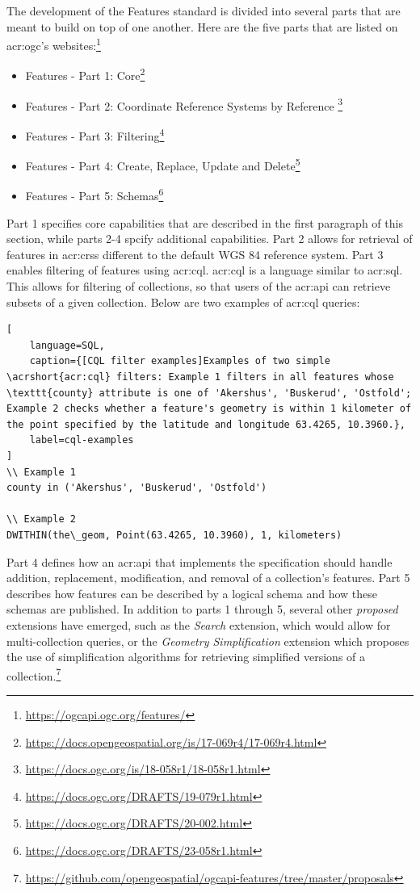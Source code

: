 The development of the Features standard is divided into several parts that are meant to build on top of one another. Here are the five parts that are listed on \acrshort{acr:ogc}'s websites:\footnote{\url{https://ogcapi.ogc.org/features/}}

\begin{itemize}
    \item Features - Part 1: Core\footnote{\url{https://docs.opengeospatial.org/is/17-069r4/17-069r4.html}}
    \item Features - Part 2: Coordinate Reference Systems by Reference \footnote{\url{https://docs.ogc.org/is/18-058r1/18-058r1.html}}
    \item Features - Part 3: Filtering\footnote{\url{https://docs.ogc.org/DRAFTS/19-079r1.html}}
    \item Features - Part 4: Create, Replace, Update and Delete\footnote{\url{https://docs.ogc.org/DRAFTS/20-002.html}}
    \item Features - Part 5: Schemas\footnote{\url{https://docs.ogc.org/DRAFTS/23-058r1.html}}
\end{itemize}

Part 1 specifies core capabilities that are described in the first paragraph of this section, while parts 2-4 spcify additional capabilities. Part 2 allows for retrieval of features in \glspl{acr:crs} different to the default WGS 84 reference system. Part 3 enables filtering of features using \gls{acr:cql}. \gls{acr:cql} is a language similar to \acrshort{acr:sql}. This allows for filtering of collections, so that users of the \acrshort{acr:api} can retrieve subsets of a given collection. Below are two examples of \gls{acr:cql} queries:

\begin{lstlisting}[
    language=SQL,
    caption={[CQL filter examples]Examples of two simple \acrshort{acr:cql} filters: Example 1 filters in all features whose \texttt{county} attribute is one of 'Akershus', 'Buskerud', 'Ostfold'; Example 2 checks whether a feature's geometry is within 1 kilometer of the point specified by the latitude and longitude 63.4265, 10.3960.},
    label=cql-examples
]
\\ Example 1
county in ('Akershus', 'Buskerud', 'Ostfold')

\\ Example 2
DWITHIN(the\_geom, Point(63.4265, 10.3960), 1, kilometers)
\end{lstlisting}

Part 4 defines how an \acrshort{acr:api} that implements the specification should handle addition, replacement, modification, and removal of a collection's features. Part 5 describes how features can be described by a logical schema and how these schemas are published. In addition to parts 1 through 5, several other \textit{proposed} extensions have emerged, such as the \textit{Search} extension, which would allow for multi-collection queries, or the \textit{Geometry Simplification} extension which proposes the use of simplification algorithms for retrieving simplified versions of a collection.\footnote{\url{https://github.com/opengeospatial/ogcapi-features/tree/master/proposals}}


